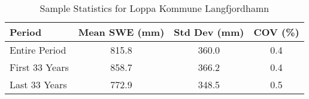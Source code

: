 
    \begin{table}[h!]
        \centering
        \caption{Sample Statistics for Loppa Kommune Langfjordhamn}
        \begin{tabular}{lccc} 
            \toprule
            \textbf{Period} & \textbf{Mean SWE (mm)} & \textbf{Std Dev (mm)} & \textbf{COV (\%)} \\
            \midrule
            Entire Period & 815.8 & 360.0 & 0.4 \\
            First 33 Years & 858.7 & 366.2 & 0.4 \\
            Last 33 Years & 772.9 & 348.5 & 0.5 \\
            \bottomrule
        \end{tabular}
        \label{tab:sample_stats_Loppa Kommune Langfjordhamn}
    \end{table}
    